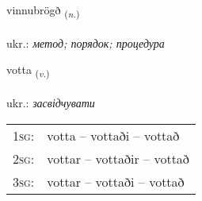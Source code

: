 \documentclass[frontgrid, backgrid]{flacards}\usepackage[]{graphicx}\usepackage[]{xcolor}
\begin{document}
\renewcommand{\blhead}{\vskip5pt {\small\bfseries\footnotesize Nafnorð | іменник }}
\renewcommand{\bcfoot}{\vskip5pt \hspace{2pt}{\small\bfseries\footnotesize 3K}}


{vinnubrögð \small{\textsubscript{(\textit{n.})}} \\[1ex] %
\textphonetic{[vɪnʏprœɣð]} \\
ukr.: \emph{метод; порядок; процедура} \\  [2ex]
\renewcommand*{\arraystretch}{0.8}
}

\renewcommand{\flhead}{\vskip5pt \fboxsep=0pt {\small\bfseries\footnotesize Sagnorð | дієслово}}
\renewcommand{\fcfoot}{\vskip5pt \fboxsep=0pt \hspace{2pt}{\small\bfseries\footnotesize 3K}}

\renewcommand{\blhead}{\vskip5pt {\small\bfseries\footnotesize Sagnorð | дієслово }}
\renewcommand{\bcfoot}{\vskip5pt \hspace{2pt}{\small\bfseries\footnotesize 3K}}


{votta \small{\textsubscript{(\textit{v.})}} \\[1ex] %
\textphonetic{[vɔhta]} \\
ukr.: \emph{засвідчувати} \\  [2ex]
\renewcommand*{\arraystretch}{0.8}
\begin{tabular}{p{1cm}l}
\textsc{1sg}: & votta -- vottaði -- vottað \\ 
\textsc{2sg}: & vottar -- vottaðir -- vottað \\ 
\textsc{3sg}: & vottar -- vottaði -- vottað \\ 
\end{tabular}
}
\end{document}
